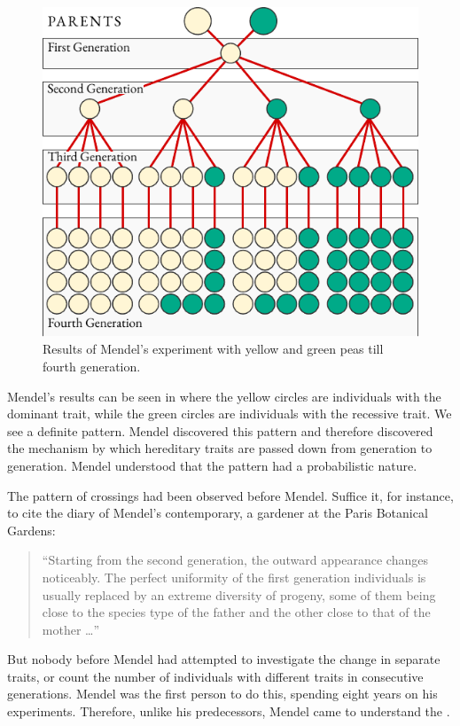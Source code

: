 \begin{figure}[!ht]
\centering
\includegraphics[width=0.95\tfwidth]{figures/mendel-expt.pdf}
\caption{Results of Mendel's experiment with yellow and green peas till fourth generation.\label{mendel-expt}}
\end{figure}

Mendel's results can be seen in  where the yellow circles are
individuals with the dominant trait, while the green circles are
individuals with the recessive trait. We see a definite pattern. Mendel
discovered this pattern and therefore discovered the mechanism by
which hereditary traits are passed down from generation to generation.
Mendel understood that the pattern had a probabilistic nature.


The pattern of crossings had been observed before Mendel. Suffice it,
for instance, to cite the diary of Mendel's contemporary, a gardener at
the Paris Botanical Gardens: 
\begin{quote}
``Starting from the second generation, the outward appearance changes noticeably. The perfect uniformity of the first generation individuals is usually replaced by an extreme diversity of progeny, some of them being close to the species type of the father and the other close to that of the mother \ldots'' 
\end{quote}
But nobody before Mendel had attempted to investigate the change in separate traits, or count the number of individuals with different traits in consecutive generations. Mendel was the first person to do this, spending eight years on his
experiments. Therefore, unlike his predecessors, Mendel came to
understand the .

